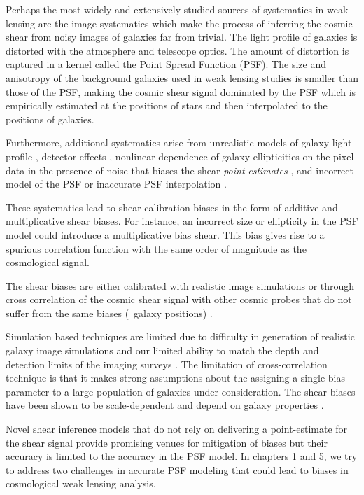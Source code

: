 Perhaps the most widely and extensively studied sources of systematics in weak lensing are the image systematics which make 
the process of inferring the cosmic shear from noisy images of galaxies far from trivial. The light profile of 
galaxies is distorted with the atmosphere and telescope optics. The amount of distortion is captured in a kernel called 
the Point Spread Function (PSF). The size and anisotropy of the background galaxies used in weak lensing studies is 
smaller than those of the PSF, making the cosmic shear signal dominated by the PSF which is empirically estimated at 
the positions of stars and then interpolated to the positions of galaxies.  

Furthermore, additional systematics arise from unrealistic models of galaxy light profile \citep{voight2010,im3shape,kac2014}, 
detector effects \citep{arun2016,jaya2016,plazas2016}, nonlinear dependence of galaxy ellipticities 
on the pixel data in the presence of noise that biases the shear \emph{point} \emph{estimates} \citep{melchoir,great3,conti2017}, 
and incorrect model of the PSF or inaccurate PSF interpolation \citep{rowe2010,kuijken2015,great3,des}.

These systematics lead to shear calibration biases in the form of additive and multiplicative 
shear biases. For instance, an incorrect size or ellipticity in the PSF model could introduce 
a multiplicative bias shear. This bias gives rise to a spurious correlation function with the 
same order of magnitude as the cosmological signal.

The shear biases are either calibrated with realistic image simulations \citep{im3shape,jee2016,conti2017} or through cross correlation of 
the cosmic shear signal with other cosmic probes that do not suffer from the same biases (\eg\ galaxy positions)
\citep{liu2016,schann,singh2017}. 

Simulation based techniques are limited due to difficulty in 
generation of realistic galaxy image simulations \citep{great3,lanus2017} and our limited ability to match the depth and detection limits of 
the imaging surveys \citep{hoekstra}. The limitation of cross-correlation technique is that it makes strong assumptions about the assigning a 
single bias parameter to a large population of galaxies under consideration. The shear biases have been shown to be scale-dependent \citep{des,jee2016} 
and depend on galaxy properties \citep{im3shape,conti2017}. 

Novel shear inference models that do not rely on delivering a point-estimate for the shear signal \citep{schneider,bernstein,huff,sheldon} 
provide promising venues for mitigation of biases but their accuracy is limited to the accuracy in the PSF model.
In chapters 1 and 5, we try to address two challenges in accurate PSF modeling that could lead to biases in cosmological weak lensing analysis. 

